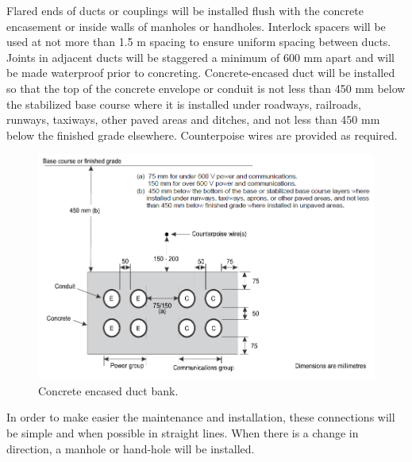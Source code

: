 	Flared ends of ducts or couplings will be installed flush with the concrete encasement or inside walls of manholes or handholes. Interlock spacers will be used at not more than 1.5 m spacing to ensure uniform spacing between ducts. Joints in adjacent ducts will be staggered a minimum of 600 mm apart and will be made waterproof prior to concreting. Concrete-encased duct will be installed so that the top of the concrete envelope or conduit is not less than 450 mm below the stabilized base course where it is installed under roadways, railroads, runways, taxiways, other paved areas and ditches, and not less than 450 mm below the finished grade elsewhere. Counterpoise wires are provided as required.
	
	\begin{figure}[H]
		\centering
		\includegraphics[clip, trim=0cm 0cm 0cm 0cm, width=1.1\textwidth]{./images/electric/concrete}
		\caption{Concrete encased duct bank.}
		\label{concrete}
	\end{figure}
	
	In order to make easier the maintenance and installation, these connections will be simple and when possible in straight lines. When there is a change in direction, a manhole or hand-hole will be installed.
	
	

